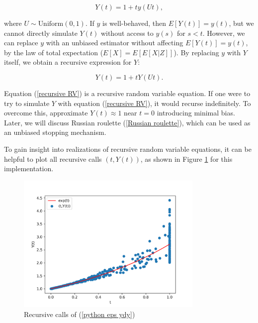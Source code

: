 \documentclass[a4paper,12pt]{article}
\begin{document}
\begin{equation}
    Y(t) = 1 + t  y(Ut),
\end{equation}

where $U \sim \text{Uniform}(0,1)$.
If $y$ is well-behaved, then $E[Y(t)] = y(t)$,
but we cannot directly simulate $Y(t)$ without access
to $y(s)$ for $s < t$. However, we can replace $y$ with
an unbiased estimator without affecting $E[Y(t)] = y(t)$,
by the law of total expectation ($E[X] = E[E[X|Z]]$).
By replacing $y$ with $Y$ itself, we obtain a recursive
expression for $Y$:

\begin{equation} \label{recursive RV}
    Y(t) = 1 + t  Y(Ut).
\end{equation}

Equation (\ref{recursive RV}) is a recursive random variable
equation. If one were to try to simulate $Y$ with equation (\ref{recursive RV}),
it would recurse indefinitely.
To overcome this, approximate
$Y(t) \approx 1$ near $t = 0$ introducing minimal bias.
Later, we will discuss Russian roulette (\ref{Russian roulette}),
which can be used as an unbiased stopping mechanism.

\vspace*{0.2cm}

\begin{pythonn} \label{python eps ydy}
    To gain insight into realizations of recursive random variable equations,
    it can be helpful to plot
    all recursive calls $(t,Y(t))$, as shown in Figure \ref{fig:intro example}
    for this implementation.

    \begin{figure}[h!]
        \centering
        \includegraphics[width=0.8\textwidth]{plots/intro example.png}
        \caption{Recursive calls of (\ref{python eps ydy})}
        \label{fig:intro example}
    \end{figure}
\end{pythonn}
\end{document}

